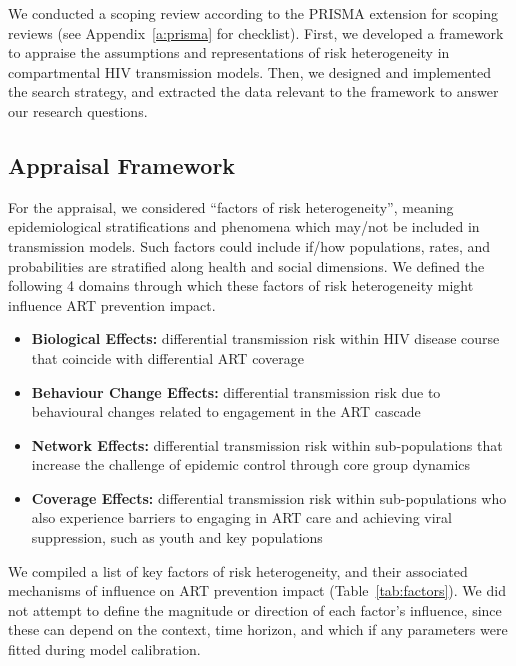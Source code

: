 We conducted a scoping review according to the PRISMA extension for scoping reviews
(see Appendix~\ref{a:prisma} for checklist).
First, we developed a framework to appraise
the assumptions and representations of risk heterogeneity
in compartmental HIV transmission models.
Then, we designed and implemented the search strategy,
and extracted the data relevant to the framework
to answer our research questions.
\subsection{Appraisal Framework}
\label{ss:meth:framework}
For the appraisal, we considered ``factors of risk heterogeneity'', meaning
epidemiological stratifications and phenomena which may/not be included in transmission models.
Such factors could include if/how populations, rates, and probabilities
are stratified along health and social dimensions.
We defined the following 4 domains through which
these factors of risk heterogeneity might influence ART prevention impact.
\begin{itemize}
  \item \textbf{Biological Effects:}
  differential transmission risk within HIV disease course
  that coincide with differential ART coverage
  \cite{Pilcher2004}
  \item \textbf{Behaviour Change Effects:}
  differential transmission risk due to
  behavioural changes related to engagement in the ART cascade
  \cite{Ramachandran2016,Tiwari2020} %
  \item \textbf{Network Effects:}
  differential transmission risk within sub-populations
  that increase the challenge of epidemic control through core group dynamics
  \cite{Anderson1986,Boily1997,Watts2010,Dodd2010}
  \item \textbf{Coverage Effects:}
  differential transmission risk within sub-populations
  who also experience barriers to engaging in ART care and achieving viral suppression,
  such as youth and key populations
  \cite{Mountain2014,Lancaster2016,Hakim2018,Green2020}
\end{itemize}
We compiled a list of key factors of risk heterogeneity,
and their associated mechanisms of influence on ART prevention impact (Table~\ref{tab:factors}).
We did not attempt to define the magnitude or direction of each factor's influence,
since these can depend on the context, time horizon,
and which if any parameters were fitted during model calibration.\cite{Eaton2014}
